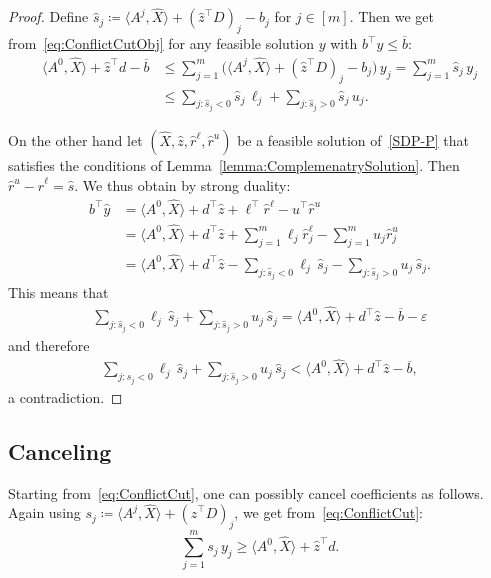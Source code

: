 \documentclass[10pt, a4paper]{article}
\newcommand{\define}{\coloneqq}
\newcommand{\skal}[2]{\langle{#1},{#2}\rangle}
\newcommand{\T}{^{\top}}
\begin{document}
\begin{proof}
  Define $\hat{s}_j \define \skal{A^j}{\hat{X}} + (\hat{z}\T D)_j - b_j$
  for $j \in [m]$. Then we get from~\eqref{eq:ConflictCutObj} for any
  feasible solution $y$ with $b\T y \leq \overline{b}$:
  \begin{align*}
    \skal{A^0}{\hat{X}} + \hat{z}\T d - \overline{b} & \leq \sum_{j=1}^m \big(\skal{A^j}{\hat{X}} + (\hat{z}\T D)_j - b_j\big)\, y_j
    = \sum_{j=1}^m \hat{s}_j\, y_j\\
    & \leq \sum_{j: \hat{s}_j < 0} \hat{s}_j\, \ell_j +
        \sum_{j: \hat{s}_j > 0} \hat{s}_j\, u_j.
  \end{align*}

  On the other hand let $(\hat{X}, \hat{z}, \hat{r}^\ell, \hat{r}^u)$ be a
  feasible solution of~\eqref{SDP-P} that satisfies the conditions of
  Lemma~\ref{lemma:ComplemenatrySolution}. Then
  $\hat{r}^u - \hat{r}^\ell = \hat{s}$.  We thus obtain by strong duality:
  \begin{align*}
    b\T \hat{y} & = \skal{A^0}{\hat{X}} + d\T \hat{z} + \ell\T \hat{r}^\ell - u\T \hat{r}^u\\
      & = \skal{A^0}{\hat{X}} + d\T \hat{z} + \sum_{j=1}^m \ell_j \hat{r}^\ell_j -
        \sum_{j=1}^m u_j \hat{r}^u_j\\
      & = \skal{A^0}{\hat{X}}  + d\T \hat{z} - \sum_{j: \hat{s}_j < 0} \ell_j\, \hat{s}_j -
        \sum_{j: \hat{s}_j > 0} u_j\, \hat{s}_j.
  \end{align*}
  This means that
  \begin{align*}
    \sum_{j: \hat{s}_j < 0} \ell_j\, \hat{s}_j +
        \sum_{j: \hat{s}_j > 0} u_j\, \hat{s}_j = \skal{A^0}{\hat{X}}  +
    d\T \hat{z} - \overline{b} - \varepsilon
  \end{align*}
  and therefore
  \begin{align*}
    \sum_{j: \hat{s}_j < 0} \ell_j\, \hat{s}_j +
        \sum_{j: \hat{s}_j > 0} u_j\, \hat{s}_j < \skal{A^0}{\hat{X}}  +
    d\T \hat{z} - \overline{b},
  \end{align*}
  a contradiction.
\end{proof}

\subsection{Canceling}
\label{sec:Canceling}

Starting from~\eqref{eq:ConflictCut}, one can possibly cancel coefficients
as follows. Again using
$s_j \define \skal{A^j}{\hat{X}} + (\hat{z}\T D)_j$, we get
from~\eqref{eq:ConflictCut}:
\begin{equation}\label{eq:ConflictCut3}
  \sum_{j=1}^m s_j\, y_j \geq \skal{A^0}{\hat{X}} + \hat{z}\T d.
\end{equation}
\end{document}
